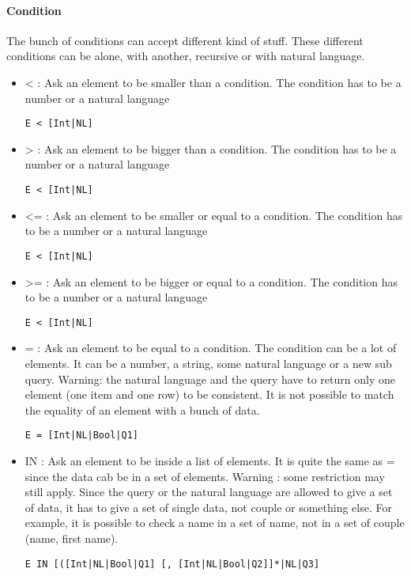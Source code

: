 \documentclass{article}
\begin{document}
\paragraph{Condition}
The bunch of conditions can accept different kind of stuff. These different conditions can be alone, with another, recursive or with natural language.
\begin{itemize}
\item < : Ask an element to be smaller than a condition. The condition has to be a number or a natural language
\begin{verbatim}
E < [Int|NL]
\end{verbatim}
\item > : Ask an element to be bigger than a condition. The condition has to be a number or a natural language
\begin{verbatim}
E < [Int|NL]
\end{verbatim}
\item <= : Ask an element to be smaller or equal to a condition. The condition has to be a number or a natural language
\begin{verbatim}
E < [Int|NL]
\end{verbatim}
\item >= : Ask an element to be bigger or equal to a condition. The condition has to be a number or a natural language
\begin{verbatim}
E < [Int|NL]
\end{verbatim}
\item = : Ask an element to be equal to a condition. The condition can be a lot of elements. It can be a number, a string, some natural language or a new sub query. Warning: the natural language and the query have to return only one element (one item and one row) to be consistent. It is not possible to match the equality of an element with a bunch of data.
\begin{verbatim}
E = [Int|NL|Bool|Q1]
\end{verbatim}
\item IN : Ask an element to be inside a list of elements. It is quite the same as = since the data cab be in a set of elements. Warning : some restriction may still apply. Since the query or the natural language are allowed to give a set of data, it has to give a set of single data, not couple or something else. For example, it is possible to check a name in a set of name, not in a set of couple (name, first name).
\begin{verbatim}
E IN [([Int|NL|Bool|Q1] [, [Int|NL|Bool|Q2]]*|NL|Q3]

\end{verbatim}
\end{itemize}
\end{document}
